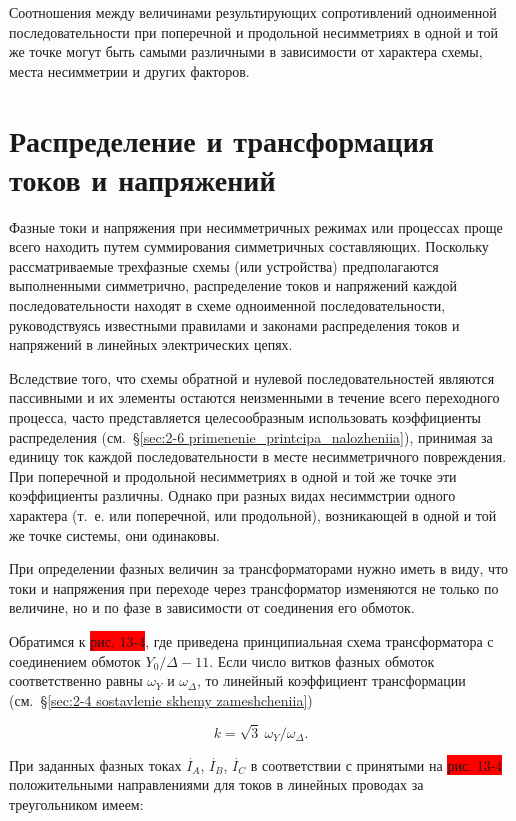Соотношения между величинами результирующих сопротивлений одноименной последовательности при поперечной и продольной несимметриях в одной и той же точке могут быть самыми различными в зависимости от характера схемы, места несимметрии и других факторов.

\section{Распределение и трансформация токов и напряжений}
\label{sec:13-5 raspredelenie_i_transformatciia_tokov_i_napriazhenii}

Фазные токи и напряжения при несимметричных режимах или процессах проще всего находить путем суммирования симметричных составляющих. Поскольку рассматриваемые трехфазные схемы (или устройства) предполагаются выполненными симметрично, распределение токов и напряжений каждой последовательности находят в схеме одноименной последовательности, руководствуясь известными правилами и законами распределения токов и напряжений в линейных электрических цепях.

Вследствие того, что схемы обратной и нулевой последовательностей являются пассивными и их элементы остаются неизменными в течение всего переходного процесса, часто представляется целесообразным использовать коэффициенты распределения (см.~§\ref{sec:2-6 primenenie_printcipa_nalozheniia}), принимая за единицу ток каждой последовательности в месте несимметричного повреждения. При поперечной и продольной несимметриях в одной и той же точке эти коэффициенты различны. Однако при разных видах несиммстрии одного характера (т.~е. или поперечной, или продольной), возникающей в одной и той же точке системы, они одинаковы.

При определении фазных величин за трансформаторами нужно иметь в виду, что токи и напряжения при переходе через трансформатор изменяются не только по величине, но и по фазе в зависимости от соединения его обмоток.

Обратимся к \colorbox{red}{рис. 13-4}, где приведена принципиальная схема трансформатора с соединением обмоток $ Y_{0}/\Delta-11 $. Если число витков фазных обмоток соответственно равны $ \omega_{Y} $ и $ \omega_{\Delta} $, то линейный коэффициент трансформации (см.~§\ref{sec:2-4 sostavlenie skhemy zameshcheniia})

\begin{equation*}
	k = \sqrt{3}~\omega_{Y} / \omega_{\Delta}.
\end{equation*}

При заданных фазных токах $ \overset{\;.}{I}_A $, $ \overset{\;.}{I}_B $, $ \overset{\;.}{I}_C $ в соответствии
с принятыми на \colorbox{red}{рис. 13-4} положительными направлениями для токов в линейных проводах за треугольником имеем:

